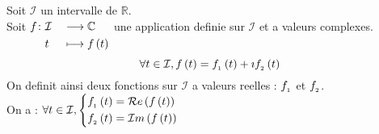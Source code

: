 \documentclass[12pt,twoside,a4paper]{article}
\author{MPSI 2}
\begin{document}
	\maketitle
	
	\section*{}
		Soit $\mathcal{I}$ un intervalle de $\mathbb{R}$. \\
		Soit $\begin{aligned}[t]f\colon&\mathcal{I}&&\longrightarrow\mathbb{C} \\&t&&\longmapsto f\left(t\right)\end{aligned}$ une application definie sur $\mathcal{I}$ et a valeurs complexes.\\
		$$
			\forall t\in\mathcal{I},f\left(t\right)=f_{_{1}}\left(t\right)+\imath f_{_{2}}\left(t\right)
		$$
		On definit ainsi deux fonctions sur $\mathcal{I}$ a valeurs reelles : $f_{_{1}}$ et $f_{_{2}}$. \\
		On a : $\forall t\in\mathcal{I},\left\{\begin{aligned}&f_{_{1}}\left(t\right)=\mathcal{R}e\left(f\left(t\right)\right)\\
													&f_{_{2}}\left(t\right)=\mathcal{I}m\left(f\left(t\right)\right)\end{aligned}\right.$
\end{document}
